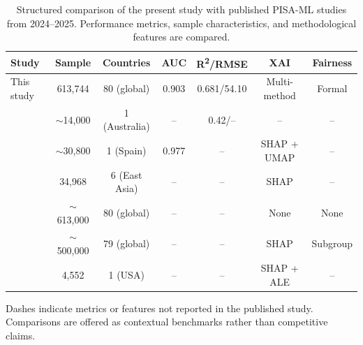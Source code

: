 \begin{table}[htp]
\centering
\small
\caption{Structured comparison of the present study with published PISA-ML studies from 2024--2025. Performance metrics, sample characteristics, and methodological features are compared.}
\label{tab:literature-benchmark}
\begin{tabular}{lcccccc}
\toprule
Study & Sample & Countries & AUC & R\textsuperscript{2}/RMSE & XAI & Fairness \\
\midrule
This study & 613,744 & 80 (global) & 0.903 & 0.681/54.10 & Multi-method & Formal \\
\citet{Khine_2024} & $\sim$14,000 & 1 (Australia) & -- & 0.42/-- & -- & -- \\
\citet{Gomez_Talal_2025} & $\sim$30,800 & 1 (Spain) & 0.977 & -- & SHAP + UMAP & -- \\
\citet{Huang_2024} & 34,968 & 6 (East Asia) & -- & -- & SHAP & -- \\
\citet{Oz_2025_stacking} & $\sim$613,000 & 80 (global) & -- & -- & None & None \\
\citet{Cheung_2024_resilience} & $\sim$500,000 & 79 (global) & -- & -- & SHAP & Subgroup \\
\citet{Zhu_2025_US_PISA} & 4,552 & 1 (USA) & -- & -- & SHAP + ALE & -- \\
\bottomrule
\end{tabular}

\par\small  Dashes indicate metrics or features not reported in the published study. Comparisons are offered as contextual benchmarks rather than competitive claims.
\end{table}
